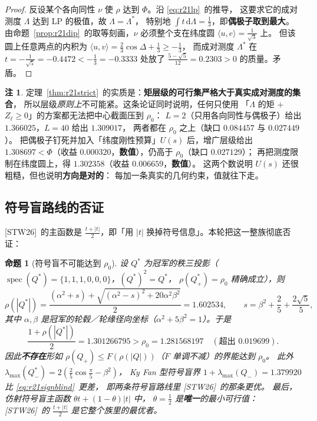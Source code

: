 \documentclass[UTF8,11pt]{ctexart}
\newtheorem{proposition}[theorem]{命题}
\theoremstyle{definition}
\newtheorem{remark}[theorem]{注}
\newcommand{\dd}{\,\mathrm{d}}
\newcommand{\STW}{\textup{[STW26]}}
\begin{document}
\begin{proof}
反设某个各向同性 $\nu$ 使 $\rho$ 达到 $\Phi$。沿 \eqref{eq:r21lp}~的推导，
这要求它的成对测度 $\Lambda$ 达到 LP 的极值，故 $\Lambda=\Lambda^*$，
特别地 $\int t\dd\Lambda=\frac13$，即\textbf{偶极子取到最大}。
由命题~\ref{prop:r21dip}~的取等刻画，$\nu$ 必须整个支在纬度圆 $\langle u,e\rangle=\frac1{\sqrt3}$ 上。
但该圆上任意两点的内积为 $\langle u,v\rangle=\frac23\cos\Delta+\frac13\ge-\frac13$，
而成对测度 $\Lambda^*$ 在 $t=-\frac1{\sqrt5}=-0.4472<-\frac13=-0.3333$ 处放了
$\frac{5-\sqrt5}{12}=0.2303>0$ 的质量。矛盾。
\end{proof}

\begin{remark}
定理~\ref{thm:r21strict}~的实质是：\textbf{矩层级的可行集严格大于真实成对测度的集合}，
所以层级\emph{原则上}不可能紧。这条论证同时说明，任何只使用
「$\Lambda$ 的矩 $+$ $Z_\ell\ge0$」的方案都无法把中心截面压到 $\rho_0$：
$L=2$（只用各向同性与偶极子）给出 $1.366025$，$L=40$ 给出 $1.309017$，
两者都在 $\rho_0$ 之上（缺口 $0.084457$ 与 $0.027449$）。
把偶极子钉死并加入「纬度刚性预算」$U(s)$ 后，增广层级给出
$1.308697<\Phi$（收益 $0.000320$，\textbf{数值}），仍高于 $\rho_0$（缺口 $0.027129$）；
再把测度限制在纬度圆上，得 $1.302358$（收益 $0.006659$，\textbf{数值}）。
这两个数说明 $U(s)$ 还很粗糙，但也说明\textbf{方向是对的}：
每加一条真实的几何约束，值就往下走。
\end{remark}

\subsection{符号盲路线的否证}\label{sec:r21:sign}

\STW~的主函数是 $\frac{t+|t|}2$，即「用 $|t|$ 换掉符号信息」。本轮把这一整族彻底否证：

\begin{proposition}[符号盲不可能达到 $\rho_0$]\label{prop:r21sign}
设 $Q^*$ 为冠军的秩三投影（$\operatorname{spec}(Q^*)=\{1,1,1,0,0,0\}$，$(Q^*)^2=Q^*$，
$\rho(Q^*_+)=\rho_0$ 精确成立），则
\[
\rho(|Q^*|)=\frac{(\alpha^2+s)+\sqrt{(\alpha^2-s)^2+20\alpha^2\beta^2}}2=1.602534,
\qquad s=\beta^2+\frac25+\frac{2\sqrt5}5,
\]
其中 $\alpha,\beta$ 是冠军的轮毂／轮缘径向坐标（$\alpha^2+5\beta^2=1$）。于是
\begin{equation}\label{eq:r21signblind}
\frac{1+\rho(|Q^*|)}2=1.301266795>\rho_0=1.281568197\quad(\text{超出 }0.019699).
\end{equation}
因此\textbf{不存在}形如 $\rho(Q_+)\le F(\rho(|Q|))$（$F$ 单调不减）的界能达到 $\rho_0$。
此外 $\lambda_{\max}(Q^*_-)=2(\frac25\cos\frac\pi5-\beta^2)$，
Ky Fan 型符号盲界 $1+\lambda_{\max}(Q_-)=1.379920$ 比 \eqref{eq:r21signblind}~更差，
即两条符号盲路线里 \STW~的那条更优。
最后，仿射符号盲主函数 $\theta t+(1-\theta)|t|$ 中，
$\theta=\frac12$ 是\textbf{唯一}的最小可行值：\STW~的 $\frac{t+|t|}2$ 是它整个族里的最优者。
\end{proposition}
\end{document}
